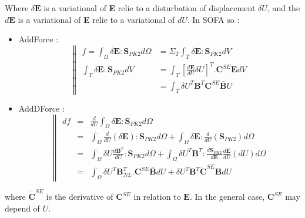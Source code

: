 \documentclass[a4paper,10pt]{article}
\begin{document}
Where $\delta \textbf{E}$ is a variational of \textbf{E} relie to a disturbation of displacement $\delta U$, and the $d \textbf{E}$ is a variational of \textbf{E} relie to a variational of $d U$. In SOFA so : 
\begin{itemize}
 \item AddForce :
      \[
      \left\| 
      \begin{array}{ll}
      f = \int_\Omega  \delta \textbf{E} : \textbf{S}_{PK2}  d\Omega  &= \Sigma_{T} \int_{T}  \delta \textbf{E} : \textbf{S}_{PK2}  dV    \\   
      \int_{T}     \delta \textbf{E} : \textbf{S}_{PK2}  dV             &= \int_{T}  [\frac{d\textbf{E}}{dU}\delta U ]^T . \textbf{C}^{SE} \textbf{E}  dV \\
								       &= \int_{T}  \delta U^T \textbf{B}^T \textbf{C}^{SE}\bar{\textbf{B}} U
      \end{array}\right.
      \]
 \item AddDForce :
      \[
      \left\| 
      \begin{array}{rcl}
      df  &=& \frac{d}{dU}\int_\Omega  \delta \textbf{E} : \textbf{S}_{PK2}  d\Omega     \\    
	  &=& \int_\Omega \frac{d}{dU}( \delta \textbf{E} ): \textbf{S}_{PK2}  d\Omega    + \int_\Omega \delta \textbf{E} : \frac{d}{dU}( \textbf{S}_{PK2})  d\Omega   \\ 
	  &=& \int_\Omega \delta U \frac{d \textbf{B}^T }{dU}: \textbf{S}_{PK2}  d\Omega    + 
                            \int_\Omega  \delta U^T \textbf{B}^T : \frac{d\textbf{S}_{PK2}}{d\textbf{E}} \frac{d\textbf{E}}{dU}(dU)  d\Omega   \\   
	  &=& \int_\Omega \delta U^T \textbf{B}^T_{NL}.\textbf{C}^{SE} \bar{\textbf{B}} dU     + \delta U^T \textbf{B}^T \dot{\textbf{C}}^{SE} \textbf{B} dU
      \end{array}\right.
      \]

\end{itemize}
where $\dot{\textbf{C}}^{SE}$ is the derivative of $\textbf{C}^{SE}$ in relation to $\textbf{E}$. In the general case, $\textbf{C}^{SE}$ may depend of $U$.
\end{document}
